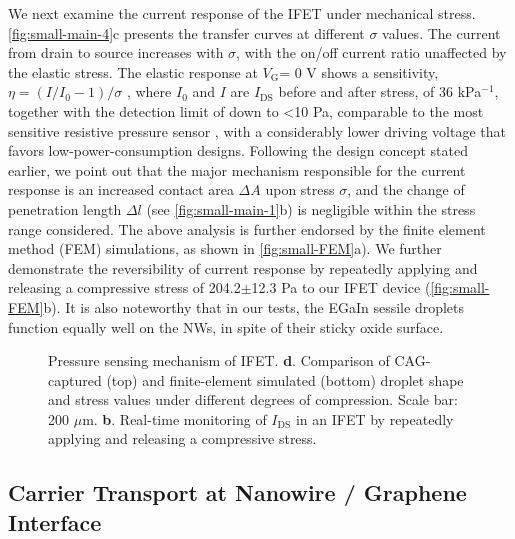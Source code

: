 We next examine the current response of the IFET under mechanical
stress.  \autoref{fig:small-main-4}c presents the transfer curves at
different \(\sigma\) values. The current from drain to source
increases with \(\sigma\), with the on/off current ratio unaffected by
the elastic stress. The elastic response at \(V_{\mathrm{G}}\)= 0 V
shows a sensitivity, \(\eta = (I/I_{0} - 1) / \sigma\) , where
\(I_{0}\) and \(I\) are \(I_{\mathrm{DS}}\) before and after stress,
of 36 kPa\(^{-1}\), together
with the detection limit of down to \textless{}10 Pa, comparable to
the most sensitive resistive pressure sensor
\cite{Mannsfeld_2010_pressure,Pang_2012_gauge,Pan_2014_pressure,Zang_2015_suspend_gate_FET},
with a considerably lower driving voltage that favors
low-power-consumption designs.
%
Following the design concept stated earlier, we point out that the
major mechanism responsible for the current response is an increased
contact area \(\Delta A\) upon stress \(\sigma\), and the change of
penetration length \(\Delta l\) (see \autoref{fig:small-main-1}b) is
negligible within the stress range considered.  The above analysis is
further endorsed by the finite element method (FEM) simulations, as
shown in \autoref{fig:small-FEM}a).  We further demonstrate the
reversibility of current response by repeatedly applying and releasing
a compressive stress of 204.2\(\pm\)12.3 Pa to our IFET device
(\autoref{fig:small-FEM}b). It is also noteworthy that in our tests,
the EGaIn sessile droplets function equally well on the NWs, in spite
of their sticky oxide surface.
\begin{figure}[!htbp]
  \centering
  \caption{\label{fig:small-FEM} Pressure sensing mechanism of IFET.
    \textbf{d}.  Comparison of CAG-captured (top) and finite-element
    simulated (bottom) droplet shape and stress values under different
    degrees of compression. Scale bar: 200
    \(\mu\)m. \textbf{b}. Real-time monitoring of \(I_{\mathrm{DS}}\)
    in an IFET by repeatedly applying and releasing a compressive
    stress.}
\end{figure}

\subsection{Carrier Transport at Nanowire / Graphene Interface}
\label{sec:small-carrier-transport}

